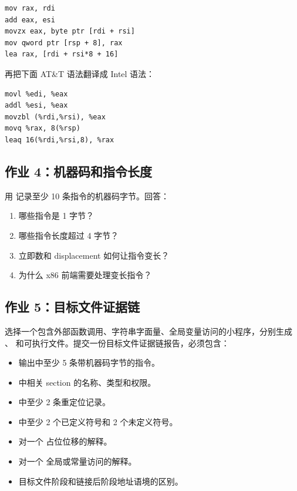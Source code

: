 \begin{exercisebox}
\begin{lstlisting}
mov rax, rdi
add eax, esi
movzx eax, byte ptr [rdi + rsi]
mov qword ptr [rsp + 8], rax
lea rax, [rdi + rsi*8 + 16]
\end{lstlisting}

再把下面 AT\&T 语法翻译成 Intel 语法：

\begin{lstlisting}
movl %edi, %eax
addl %esi, %eax
movzbl (%rdi,%rsi), %eax
movq %rax, 8(%rsp)
leaq 16(%rdi,%rsi,8), %rax
\end{lstlisting}

\subsection*{作业 4：机器码和指令长度}

用  记录至少 10 条指令的机器码字节。回答：

\begin{enumerate}
  \item 哪些指令是 1 字节？
  \item 哪些指令长度超过 4 字节？
  \item 立即数和 displacement 如何让指令变长？
  \item 为什么 x86 前端需要处理变长指令？
\end{enumerate}

\subsection*{作业 5：目标文件证据链}

选择一个包含外部函数调用、字符串字面量、全局变量访问的小程序，分别生成 、 和可执行文件。提交一份目标文件证据链报告，必须包含：

\begin{itemize}
  \item {} 输出中至少 5 条带机器码字节的指令。
  \item {} 中相关 section 的名称、类型和权限。
  \item {} 中至少 2 条重定位记录。
  \item {} 中至少 2 个已定义符号和 2 个未定义符号。
  \item 对一个  占位位移的解释。
  \item 对一个 \code{[rip + ...]} 全局或常量访问的解释。
  \item 目标文件阶段和链接后阶段地址语境的区别。
\end{itemize}


\end{exercisebox}
